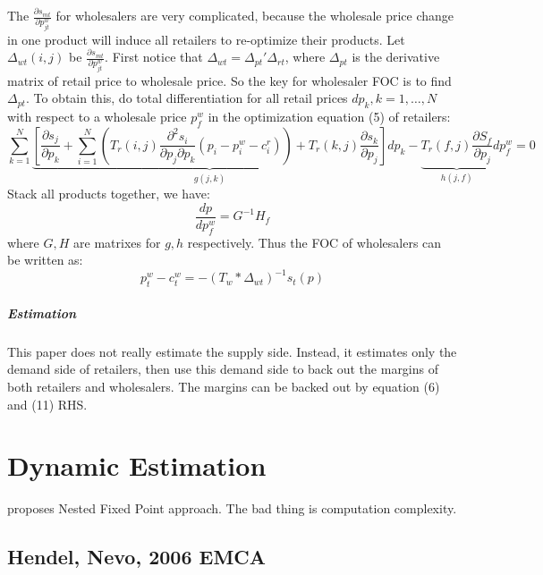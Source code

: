The $\frac{\partial s_{m t}}{\partial p_{j t}^{w}}$ for wholesalers are very complicated, because the wholesale price change in one product will induce all retailers to re-optimize their products.
Let $\Delta_{wt}(i,j)$ be $\frac{\partial s_{m t}}{\partial p_{j t}^{w}}$.
First notice that $\Delta_{wt} = \Delta_{pt}'\Delta_{rt}$, where $\Delta_{pt}$ is the derivative matrix of retail price to wholesale price. 
So the key for wholesaler FOC is to find $\Delta_{pt}$.
To obtain this, do total differentiation for all retail prices $dp_k,k=1,\ldots,N$ with respect to a wholesale price $p^w_f$ in the optimization equation (5) of retailers:
\[
    \sum_{k=1}^{N} \underbrace{\left[\frac{\partial s_{j}}{\partial p_{k}}+\sum_{i=1}^{N}\left(T_{r}(i, j) \frac{\partial^{2} s_{i}}{\partial p_{j} \partial p_{k}}\left(p_{i}-p_{i}^{w}-c_{i}^{r}\right)\right)+T_{r}(k, j) \frac{\partial s_{k}}{\partial p_{j}}\right]}_{g(j, k)} d p_{k} - 
    \underbrace{T_{r}(f, j) \frac{\partial S_{f}}{\partial p_{j}}}_{h(j, f)} d p_{f}^{w}=0
\]
Stack all products together, we have:
\[
    \frac{d p}{d p_{f}^{w}}=G^{-1} H_{f}
\]
where $G,H$ are matrixes for $g,h$ respectively.
Thus the FOC of wholesalers can be written as:
\[
    p_{t}^{w}-c_{t}^{w}=-\left(T_{w} * \Delta_{w t}\right)^{-1} s_{t}(p)
    \tag{11}
\]

\paragraph{Estimation}

This paper does not really estimate the supply side.
Instead, it estimates only the demand side of retailers, then use this demand side to back out the margins of both retailers and wholesalers.
The margins can be backed out by equation (6) and (11) RHS.




\chapter{Dynamic Estimation}
\label{cha:dynamic_estimation}

\citet{Rust1987} proposes Nested Fixed Point approach.
The bad thing is computation complexity.

\section{Hendel, Nevo, 2006 EMCA} %
\label{sec:hendel_nevo_2006_emca}


